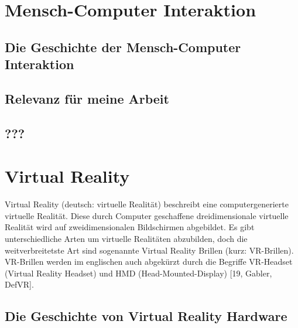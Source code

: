 \section{Mensch-Computer Interaktion}\label{sec:HCI}


\subsection{Die Geschichte der Mensch-Computer Interaktion}\label{sec:HCIGeschichte}


\subsection{Relevanz für meine Arbeit}\label{sec:RelevanzHCI}


\subsection{???}\label{sec:???}


\section{Virtual Reality}\label{sec:VR}

Virtual Reality (deutsch: virtuelle Realität) beschreibt eine computergenerierte virtuelle Realität. Diese durch Computer geschaffene dreidimensionale virtuelle Realität wird auf zweidimensionalen Bildschirmen abgebildet. Es gibt unterschiedliche Arten um virtuelle Realitäten abzubilden, doch die weitverbreitetste Art sind sogenannte Virtual Reality Brillen (kurz: VR-Brillen). VR-Brillen werden im englischen auch abgekürzt durch die Begriffe VR-Headset (Virtual Reality Headset) und HMD (Head-Mounted-Display) [19, Gabler, DefVR].

\subsection{Die Geschichte von Virtual Reality Hardware}\label{sec:VRGeschichte}

